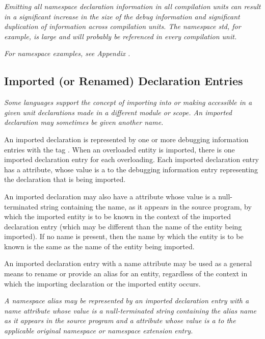 \textit{Emitting all namespace declaration information in all
compilation units can result in a significant increase in the
size of the debug information and significant duplication of
information across compilation units. 
The  namespace std,
for example, 
is large and will probably be referenced in
every  compilation unit.
}

\textit{For  namespace examples, 
see Appendix .
}


\subsection{Imported (or Renamed) Declaration Entries} 
\label{chap:importedorrenameddeclarationentries}
\textit{Some languages support the concept of importing into or making
accessible in a given unit declarations made in a different
module or scope. An imported declaration may sometimes be
given another name.
}

An imported declaration is represented by one or
more debugging information entries with the 
tag \DWTAGimporteddeclarationTARG. 
When 
\hypertarget{chap:DWATimportimporteddeclaration}{}
an overloaded entity
is imported, there is one imported declaration entry for
each overloading. 
Each imported declaration entry has a
\DWATimportDEFN{} attribute,
whose value is a  to the
debugging information entry representing the declaration that
is being imported.

An imported declaration may also have a 
\DWATname{}
attribute
whose value is a null-terminated string containing the
name, as it appears in the source program, by which the
imported entity is to be known in the context of the imported
declaration entry (which may be different than the name of
the entity being imported). If no name is present, then the
name by which the entity is to be known is the same as the
name of the entity being imported.

An imported declaration entry with a name attribute may be
used as a general means to rename or provide an alias for
an entity, regardless of the context in which the importing
declaration or the imported entity occurs.

\textit{A  namespace alias may be represented 
by an imported
\hypertarget{chap:DWATimportnamespacealias}{}
declaration entry 
with a name attribute whose value is
a null-terminated string containing the alias name as it
appears in the source program and a \DWATimportDEFN{} attribute 
whose value is a  to the 
applicable original namespace or namespace extension entry.
}

